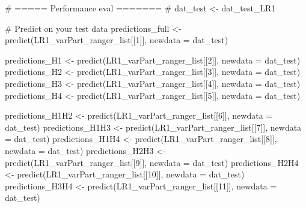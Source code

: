 \documentclass[
  letterpaper,
  DIV=11,
  numbers=noendperiod]{scrreprt}
\newenvironment{Shaded}{\begin{snugshade}}{\end{snugshade}}
\newcommand{\AttributeTok}[1]{\textcolor[rgb]{0.40,0.45,0.13}{#1}}
\newcommand{\CommentTok}[1]{\textcolor[rgb]{0.37,0.37,0.37}{#1}}
\newcommand{\DecValTok}[1]{\textcolor[rgb]{0.68,0.00,0.00}{#1}}
\newcommand{\FunctionTok}[1]{\textcolor[rgb]{0.28,0.35,0.67}{#1}}
\newcommand{\NormalTok}[1]{\textcolor[rgb]{0.00,0.23,0.31}{#1}}
\newcommand{\OtherTok}[1]{\textcolor[rgb]{0.00,0.23,0.31}{#1}}
\begin{document}
\begin{Shaded}
\begin{Highlighting}[]
\CommentTok{\# ===== Performance eval ======= \#}
\NormalTok{dat\_test }\OtherTok{\textless{}{-}}\NormalTok{ dat\_test\_LR1}

\CommentTok{\# Predict on your test data}
\NormalTok{predictions\_full }\OtherTok{\textless{}{-}} \FunctionTok{predict}\NormalTok{(LR1\_varPart\_ranger\_list[[}\DecValTok{1}\NormalTok{]], }\AttributeTok{newdata =}\NormalTok{ dat\_test)}

\NormalTok{predictions\_H1 }\OtherTok{\textless{}{-}} \FunctionTok{predict}\NormalTok{(LR1\_varPart\_ranger\_list[[}\DecValTok{2}\NormalTok{]], }\AttributeTok{newdata =}\NormalTok{ dat\_test)}
\NormalTok{predictions\_H2 }\OtherTok{\textless{}{-}} \FunctionTok{predict}\NormalTok{(LR1\_varPart\_ranger\_list[[}\DecValTok{3}\NormalTok{]], }\AttributeTok{newdata =}\NormalTok{ dat\_test)}
\NormalTok{predictions\_H3 }\OtherTok{\textless{}{-}} \FunctionTok{predict}\NormalTok{(LR1\_varPart\_ranger\_list[[}\DecValTok{4}\NormalTok{]], }\AttributeTok{newdata =}\NormalTok{ dat\_test)}
\NormalTok{predictions\_H4 }\OtherTok{\textless{}{-}} \FunctionTok{predict}\NormalTok{(LR1\_varPart\_ranger\_list[[}\DecValTok{5}\NormalTok{]], }\AttributeTok{newdata =}\NormalTok{ dat\_test)}

\NormalTok{predictions\_H1H2 }\OtherTok{\textless{}{-}} \FunctionTok{predict}\NormalTok{(LR1\_varPart\_ranger\_list[[}\DecValTok{6}\NormalTok{]], }\AttributeTok{newdata =}\NormalTok{ dat\_test)}
\NormalTok{predictions\_H1H3 }\OtherTok{\textless{}{-}} \FunctionTok{predict}\NormalTok{(LR1\_varPart\_ranger\_list[[}\DecValTok{7}\NormalTok{]], }\AttributeTok{newdata =}\NormalTok{ dat\_test)}
\NormalTok{predictions\_H1H4 }\OtherTok{\textless{}{-}} \FunctionTok{predict}\NormalTok{(LR1\_varPart\_ranger\_list[[}\DecValTok{8}\NormalTok{]], }\AttributeTok{newdata =}\NormalTok{ dat\_test)}
\NormalTok{predictions\_H2H3 }\OtherTok{\textless{}{-}} \FunctionTok{predict}\NormalTok{(LR1\_varPart\_ranger\_list[[}\DecValTok{9}\NormalTok{]], }\AttributeTok{newdata =}\NormalTok{ dat\_test)}
\NormalTok{predictions\_H2H4 }\OtherTok{\textless{}{-}} \FunctionTok{predict}\NormalTok{(LR1\_varPart\_ranger\_list[[}\DecValTok{10}\NormalTok{]], }\AttributeTok{newdata =}\NormalTok{ dat\_test)}
\NormalTok{predictions\_H3H4 }\OtherTok{\textless{}{-}} \FunctionTok{predict}\NormalTok{(LR1\_varPart\_ranger\_list[[}\DecValTok{11}\NormalTok{]], }\AttributeTok{newdata =}\NormalTok{ dat\_test)}


\end{Highlighting}
\end{Shaded}
\end{document}
